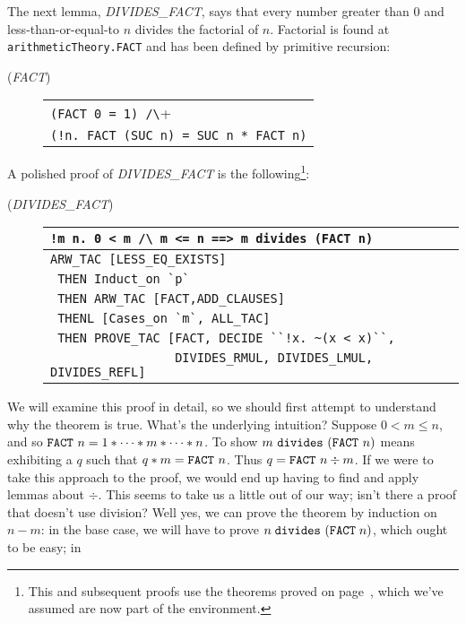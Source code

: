 The next lemma, {\small{\it DIVIDES\_FACT\/}}, says that every number
greater than $0$ and less-than-or-equal-to $n$ divides the factorial of
$n$. Factorial is found at \verb+arithmeticTheory.FACT+ and has been
defined by primitive recursion:
\begin{description}
\item [\small{({\it FACT\/})}]
\begin{tabular}[t]{l}
\verb+(FACT 0 = 1) /\+ \\
\verb+(!n. FACT (SUC n) = SUC n * FACT n)+ \\
\end{tabular}
\end{description}
A polished proof of {\small{\it DIVIDES\_FACT\/}} is the
following\footnote{This and subsequent proofs use the theorems proved
  on page~\pageref{euclid:extra-proofs}, which we've assumed are
  now part of the \ML{} environment.}:
\begin{description}
\item [\small{({\it DIVIDES\_FACT\/})}]
\begin{tabular}[t]{l}
\verb+!m n. 0 < m /\ m <= n ==> m divides (FACT n)+ \\ \hline
\verb+ARW_TAC [LESS_EQ_EXISTS]+ \\
\verb+ THEN Induct_on `p`+ \\
\verb+ THEN ARW_TAC [FACT,ADD_CLAUSES]+ \\
\verb+ THENL [Cases_on `m`, ALL_TAC]+ \\
\verb+ THEN PROVE_TAC [FACT, DECIDE ``!x. ~(x < x)``,+ \\
\verb+                 DIVIDES_RMUL, DIVIDES_LMUL, DIVIDES_REFL]+ \\
\end{tabular}
\end{description}
We will examine this proof in detail, so we should first attempt to
understand why the theorem is true. What's the underlying intuition?
Suppose $0 < m \leq n$, and so $\mbox{\tt FACT}\ n = 1 * \cdots * m *
\cdots * n$. To show $m\ \mbox{\tt divides}\ (\mbox{\tt FACT}\ n)$
means exhibiting a $q$ such that $q * m = \mbox{\tt FACT}\ n$. Thus $q
= \mbox{\tt FACT}\ n \div m$. If we were to take this approach to the
proof, we would end up having to find and apply lemmas about $\div$.
This seems to take us a little out of our way; isn't there a proof
that doesn't use division? Well yes, we can prove the theorem by
induction on $n - m$: in the base case, we will have to prove $n\;
\mbox{\tt divides}\ (\mbox{\tt FACT}\; n)$, which ought to be easy; in
